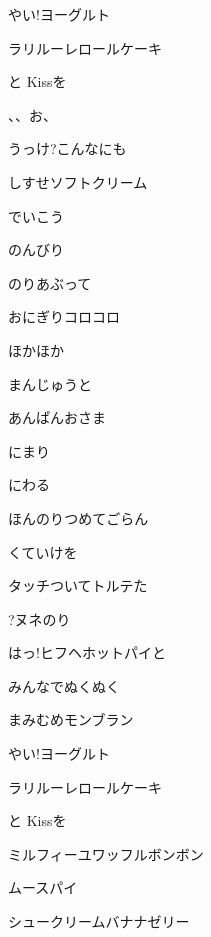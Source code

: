 \documentclass[14pt]{ltjsarticle}
\begin{document}
{  やい!ヨーグルト
  \jisho{}

  ラリルーレロールケーキ
  \jisho{}

  と Kissを
  \jisho{}

  、、お、
  \jisho{}

  うっけ?こんなにも
  \jisho{}

  しすせソフトクリーム
  \jisho{}

  でいこう
  \jisho{}

\item
  のんびり
  \jisho{}

  のりあぶって
  \jisho{}

  おにぎりコロコロ
  \jisho{}

  ほかほか
  \jisho{}

\item
  まんじゅうと
  \jisho{}

  あんぱんおさま
  \jisho{}

  にまり
  \jisho{}

  にわる
  \jisho{}

\item
  ほんのりつめてごらん
  \jisho{}

  くていけを
  \jisho{}

\item
  タッチついてトルテた
  \jisho{}

  ?ヌネのり
  \jisho{}

  はっ!ヒフヘホットパイと
  \jisho{}

  みんなでぬくぬく
  \jisho{}

  まみむめモンブラン
  \jisho{}

  やい!ヨーグルト
  \jisho{}

  ラリルーレロールケーキ
  \jisho{}

  と Kissを
  \jisho{}

\item
  ミルフィーユワッフルボンボン
  \jisho{}

  ムースパイ
  \jisho{}

  シュークリームバナナゼリー
  \jisho{}

}
\end{document}
